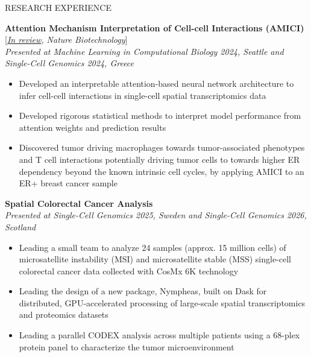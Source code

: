 \documentclass{resume} %
\begin{document}
\begin{rSection}{RESEARCH EXPERIENCE}
{    \textbf{Attention Mechanism Interpretation of Cell-cell Interactions (AMICI)} [\textit{\href{https://www.biorxiv.org/content/10.1101/2025.09.22.677860v1}{In review}, Nature Biotechnology}] \\
    \textit{Presented at Machine Learning in Computational Biology 2024, Seattle and Single-Cell Genomics 2024, Greece}
    \begin{itemize}
        \itemsep -0.5em \vspace{-0.5em}
        \item Developed an interpretable attention-based neural network architecture to infer cell-cell interactions in single-cell spatial transcriptomics data
        \item Developed rigorous statistical methods to interpret model performance from attention weights and prediction results
        \item Discovered tumor driving macrophages towards tumor-associated phenotypes and T cell interactions potentially driving tumor cells to towards higher ER dependency beyond the known intrinsic cell cycles, by applying AMICI to an ER+ breast cancer sample
    \end{itemize}
    
    \textbf{Spatial Colorectal Cancer Analysis}\\
    \textit{Presented at Single-Cell Genomics 2025, Sweden and Single-Cell Genomics 2026, Scotland}
    \begin{itemize}
        \itemsep -0.5em \vspace{-0.5em}
        \item Leading a small team to analyze 24 samples (approx. 15 million cells) of microsatellite instability (MSI) and microsatellite stable (MSS) single-cell colorectal cancer data collected with CosMx 6K technology
        \item Leading the design of a new package, Nympheas, built on Dask for distributed, GPU-accelerated processing of large-scale spatial transcriptomics and proteomics datasets
        \item Leading a parallel CODEX analysis across multiple patients using a 68-plex protein panel to characterize the tumor microenvironment
    \end{itemize}
}


\end{rSection}
\end{document}

